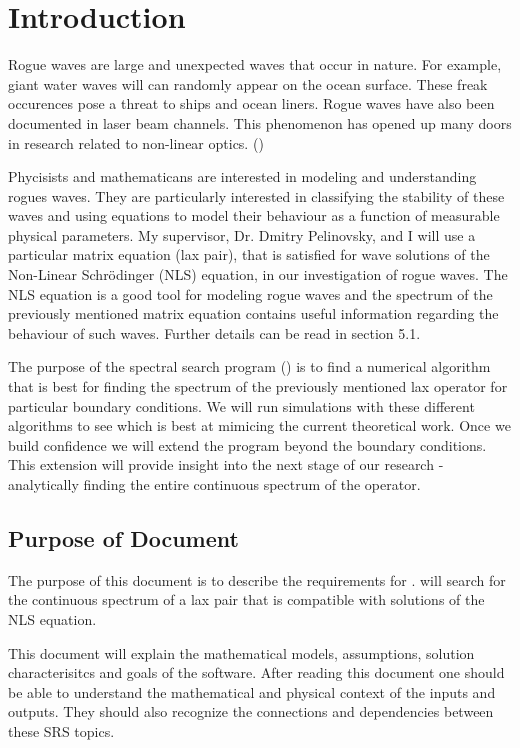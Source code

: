 \documentclass[12pt]{article}
\begin{document}
\newpage
\tableofcontents

\newpage 
\section{Introduction}

Rogue waves are large and unexpected waves that occur in nature. For example,  
giant water waves will can randomly appear on the ocean surface. These freak 
occurences pose a threat to ships and ocean liners. Rogue waves have also been 
documented in laser beam channels. 
This phenomenon has opened up many doors in research related to non-linear 
optics. (\cite{roguewaves})

Phycisists and mathematicans are interested in modeling and understanding 
rogues waves. They are particularly interested in classifying the stability of 
these waves and using equations to model their behaviour as a function of 
measurable physical parameters. My supervisor, Dr. Dmitry Pelinovsky, and I 
will use a particular matrix equation (lax pair), that is satisfied for wave 
solutions of the Non-Linear Schr\"{o}dinger (NLS) equation, in our 
investigation of rogue waves. The NLS equation is a good tool for modeling 
rogue waves and the spectrum of the previously mentioned matrix equation 
contains useful information regarding the behaviour of such waves. Further 
details can be read in section 5.1. 

The purpose of the spectral search program (\progname) is to find a numerical 
algorithm that is best for 
finding the spectrum of the previously mentioned lax operator for particular 
boundary conditions. We will run simulations with these different algorithms to 
see which is best at mimicing the current theoretical work. Once we build 
confidence we will extend the program beyond the boundary conditions. This 
extension will provide insight into the next stage of our research - 
analytically finding the entire continuous spectrum of the operator. 

\subsection{Purpose of Document}
The purpose of this document is to describe the requirements for \progname. 
\progname will search for the 
continuous spectrum of a lax pair that is compatible with solutions 
of the NLS equation. 

This document will explain the mathematical models, assumptions, 
solution characterisitcs and goals of the software. After reading this document 
one should be able to understand the mathematical and physical context of the 
inputs and outputs. They should also recognize the connections and 
dependencies between these SRS topics. 
\end{document}
